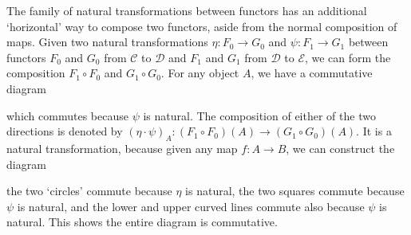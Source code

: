 The family of natural transformations between functors has an additional `horizontal' way to compose two functors, aside from the normal composition of maps. Given two natural transformations $\eta: F_0 \to G_0$ and $\psi: F_1 \to G_1$ between functors $F_0$ and $G_0$ from $\mathcal{C}$ to $\mathcal{D}$ and $F_1$ and $G_1$ from $\mathcal{D}$ to $\mathcal{E}$, we can form the composition $F_1 \circ F_0$ and $G_1 \circ G_0$. For any object $A$, we have a commutative diagram
%
\begin{center}
\end{center}
%
which commutes because $\psi$ is natural. The composition of either of the two directions is denoted by $(\eta \cdot \psi)_A: (F_1 \circ F_0)(A) \to (G_1 \circ G_0)(A)$. It is a natural transformation, because given any map $f: A \to B$, we can construct the diagram
%
\begin{center}
\end{center}
%
the two `circles' commute because $\eta$ is natural, the two squares commute because $\psi$ is natural, and the lower and upper curved lines commute also because $\psi$ is natural. This shows the entire diagram is commutative.

